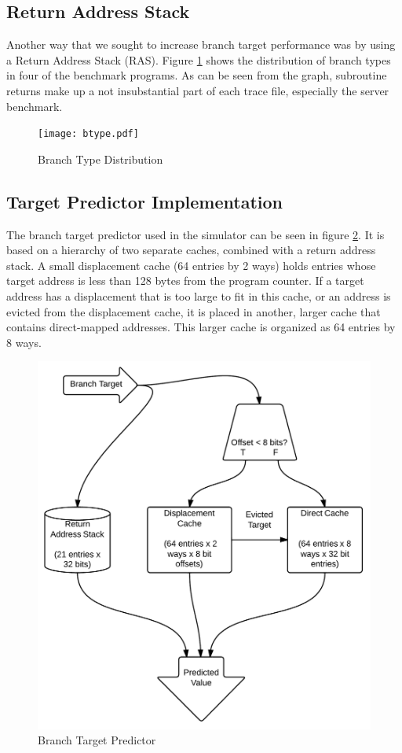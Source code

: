 \documentclass[twocolumn]{article}
\newcommand{\centerimage}[3]{
\begin{figure}[ht!]  
\begin{center} #1
\caption{#2}
\label{#3}
\end{center}
\end{figure}}
\begin{document}
\subsection{Return Address Stack}
Another way that we sought to increase branch target performance was
by using a Return Address Stack (RAS). Figure \ref{btype} shows the
distribution of branch types in four of the benchmark programs. As can
be seen from the graph, subroutine returns make up a not insubstantial
part of each trace file, especially the server benchmark. 

\centerimage{\texttt{[image: btype.pdf]}}{Branch Type Distribution}{btype}


\subsection{Target Predictor Implementation}

The branch target predictor used in the simulator can be seen in
figure \ref{btbshape}. It is based on a hierarchy of two separate
caches, combined with a return address stack. A small displacement
cache (64 entries by 2 ways) holds entries whose target address is
less than 128 bytes from the program counter. If a target address has
a displacement that is too large to fit in this cache, or an address
is evicted from the displacement cache, it is placed in another,
larger cache that contains direct-mapped addresses. This larger cache
is organized as 64 entries by 8 ways.

\centerimage{\includegraphics[width=\columnwidth]{BTB.png}}{Branch
  Target Predictor}{btbshape}
\end{document}
